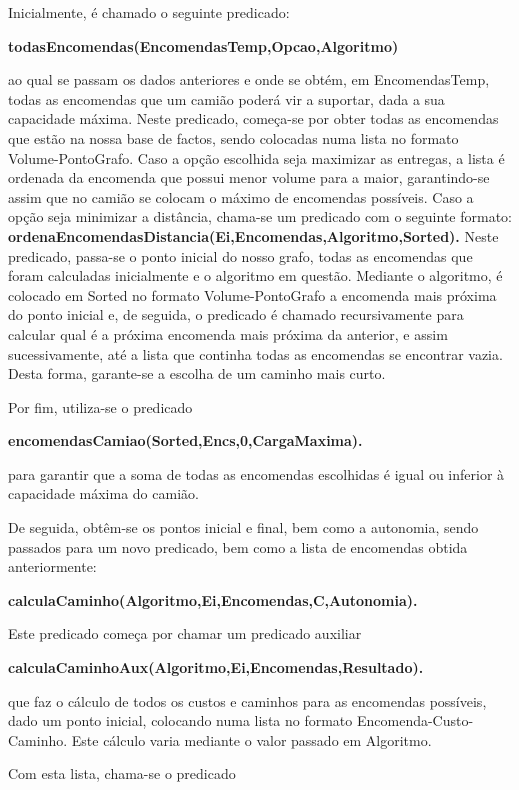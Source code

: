 \documentclass[a4paper]{article}
\begin{document}
Inicialmente, é chamado o seguinte predicado:

\centerline{\textbf{todasEncomendas(EncomendasTemp,Opcao,Algoritmo)}}

ao qual se passam os dados anteriores e onde se obtém, em EncomendasTemp, todas as encomendas que um camião poderá vir a suportar, dada a sua capacidade máxima. Neste predicado, começa-se por obter todas as encomendas que estão na nossa base de factos, sendo colocadas numa lista no formato Volume-PontoGrafo. Caso a opção escolhida seja maximizar as entregas, a lista é ordenada da encomenda que possui menor volume para a maior, garantindo-se assim que no camião se colocam o máximo de encomendas possíveis. Caso a opção seja minimizar a distância, chama-se um predicado com o seguinte formato: \textbf{ordenaEncomendasDistancia(Ei,Encomendas,Algoritmo,Sorted).} Neste predicado, passa-se o ponto inicial do nosso grafo, todas as encomendas que foram calculadas inicialmente e o algoritmo em questão. Mediante o algoritmo, é colocado em Sorted no formato Volume-PontoGrafo a encomenda mais próxima do ponto inicial e, de seguida, o predicado é chamado recursivamente para calcular qual é a próxima encomenda mais próxima da anterior, e assim sucessivamente, até a lista que continha todas as encomendas se encontrar vazia. Desta forma, garante-se a escolha de um caminho mais curto.

Por fim, utiliza-se o predicado

\centerline{\textbf{encomendasCamiao(Sorted,Encs,0,CargaMaxima).}}

para garantir que a soma de todas as encomendas escolhidas é igual ou inferior à capacidade máxima do camião.

De seguida, obtêm-se os pontos inicial e final, bem como a autonomia, sendo passados para um novo predicado, bem como a lista de encomendas obtida anteriormente:

\centerline{\textbf{calculaCaminho(Algoritmo,Ei,Encomendas,C,Autonomia).}}

Este predicado começa por chamar um predicado auxiliar

\centerline{\textbf{calculaCaminhoAux(Algoritmo,Ei,Encomendas,Resultado).}}

que faz o cálculo de todos os custos e caminhos para as encomendas possíveis, dado um ponto inicial, colocando numa lista no formato Encomenda-Custo-Caminho. Este cálculo varia mediante o valor passado em Algoritmo. 

Com esta lista, chama-se o predicado
\end{document}
